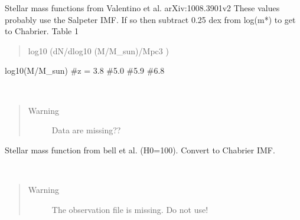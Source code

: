 \documentclass[letterpaper,10pt,english]{sphinxmanual}
\begin{document}

\begin{fulllineitems}
\label{SamPy.astronomy:SamPy.astronomy.stellarMFs.highRedshiftMFs}
Stellar mass functions from Valentino et al. arXiv:1008.3901v2
These values probably use the Salpeter IMF.
If so then subtract 0.25 dex from log(m*) to get to Chabrier.
Table 1
\begin{quote}

log10 (dN/dlog10 (M/M\_sun)/Mpc3 )
\end{quote}

log10(M/M\_sun)     \#z = 3.8    \#5.0    \#5.9    \#6.8

\end{fulllineitems}



\begin{fulllineitems}
\label{SamPy.astronomy:SamPy.astronomy.stellarMFs.mstar_bell}~\begin{quote}\begin{description}
\item[{Warning }] \leavevmode
Data are missing??

\end{description}\end{quote}

Stellar mass function from bell et al. (H0=100).
Convert to Chabrier IMF.

\end{fulllineitems}



\begin{fulllineitems}
\label{SamPy.astronomy:SamPy.astronomy.stellarMFs.mstar_lin}~\begin{quote}\begin{description}
\item[{Warning }] \leavevmode
The observation file is missing. Do not use!

\end{description}\end{quote}

\end{fulllineitems}
\end{document}

